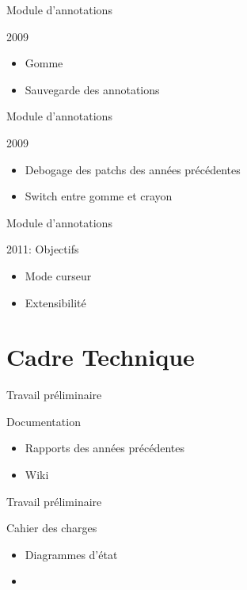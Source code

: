 \documentclass{beamer}
\begin{document}
\begin{frame}{Module d'annotations}
    \begin{block}{2009}
        \begin{itemize}[<+->]
            \item Gomme
	    \item Sauvegarde des annotations
        \end{itemize}
    \end{block}
\end{frame}

\begin{frame}{Module d'annotations}
    \begin{block}{2009}
        \begin{itemize}[<+->]
            \item Debogage des patchs des années précédentes
	    \item Switch entre gomme et crayon
        \end{itemize}
    \end{block}
\end{frame}

\begin{frame}{Module d'annotations}
    \begin{block}{2011: Objectifs}
        \begin{itemize}[<+->]
            \item Mode curseur
            \item Extensibilité
        \end{itemize}
    \end{block}
\end{frame}

\section{Cadre Technique}

\begin{frame}{Travail préliminaire}
    \begin{block}{Documentation}
        \begin{itemize}[<+->]
            \item Rapports des années précédentes
            \item Wiki
        \end{itemize}
    \end{block}
\end{frame}

\begin{frame}{Travail préliminaire}
    \begin{block}{Cahier des charges}
        \begin{itemize}[<+->]
            \item Diagrammes d'état
            \item 
        \end{itemize}
    \end{block}
\end{frame}
\end{document}
